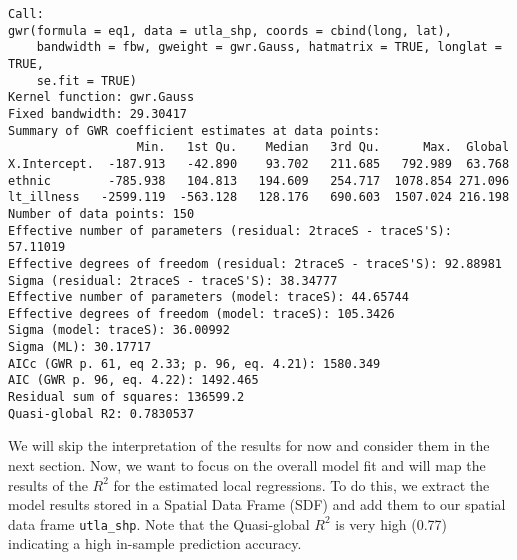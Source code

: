\documentclass[
  letterpaper,
  krantz2]{style/krantz}
\begin{document}
\begin{verbatim}
Call:
gwr(formula = eq1, data = utla_shp, coords = cbind(long, lat), 
    bandwidth = fbw, gweight = gwr.Gauss, hatmatrix = TRUE, longlat = TRUE, 
    se.fit = TRUE)
Kernel function: gwr.Gauss 
Fixed bandwidth: 29.30417 
Summary of GWR coefficient estimates at data points:
                  Min.   1st Qu.    Median   3rd Qu.      Max.  Global
X.Intercept.  -187.913   -42.890    93.702   211.685   792.989  63.768
ethnic        -785.938   104.813   194.609   254.717  1078.854 271.096
lt_illness   -2599.119  -563.128   128.176   690.603  1507.024 216.198
Number of data points: 150 
Effective number of parameters (residual: 2traceS - traceS'S): 57.11019 
Effective degrees of freedom (residual: 2traceS - traceS'S): 92.88981 
Sigma (residual: 2traceS - traceS'S): 38.34777 
Effective number of parameters (model: traceS): 44.65744 
Effective degrees of freedom (model: traceS): 105.3426 
Sigma (model: traceS): 36.00992 
Sigma (ML): 30.17717 
AICc (GWR p. 61, eq 2.33; p. 96, eq. 4.21): 1580.349 
AIC (GWR p. 96, eq. 4.22): 1492.465 
Residual sum of squares: 136599.2 
Quasi-global R2: 0.7830537 
\end{verbatim}

We will skip the interpretation of the results for now and consider them
in the next section. Now, we want to focus on the overall model fit and
will map the results of the \(R^{2}\) for the estimated local
regressions. To do this, we extract the model results stored in a
Spatial Data Frame (SDF) and add them to our spatial data frame
\texttt{utla\_shp}. Note that the Quasi-global \(R^{2}\) is very high
(0.77) indicating a high in-sample prediction accuracy.
\end{document}
